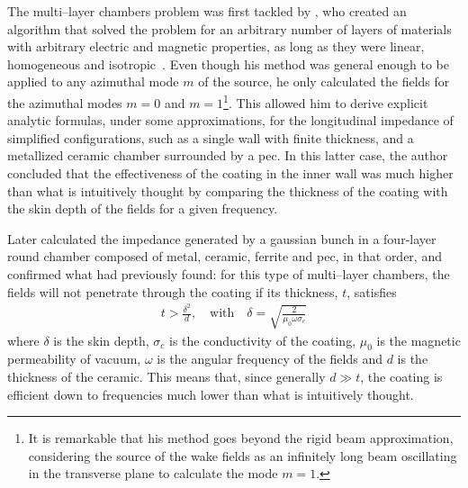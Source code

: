     The multi--layer chambers problem was first tackled by , who created an algorithm that solved the problem for an arbitrary number of layers of materials with arbitrary electric and magnetic properties, as long as they were linear, homogeneous and isotropic~\cite{Zotter1969,Zotter1969a,Zotter1970}. Even though his method was general enough to be applied to any azimuthal mode $m$ of the source, he only calculated the fields for the azimuthal modes $m=0$ and $m=1$\footnote{It is remarkable that his method goes beyond the rigid beam approximation, considering the source of the wake fields as an infinitely long beam oscillating in the transverse plane to calculate the mode $m=1$.}. This allowed him to derive explicit analytic formulas, under some approximations, for the longitudinal impedance of simplified configurations, such as a single wall with finite thickness, and a metallized ceramic chamber surrounded by a \gls{pec}. In this latter case, the author concluded that the effectiveness of the coating in the inner wall was much higher than what is intuitively thought by comparing the thickness of the coating with the skin depth of the fields for a given frequency.

    Later  calculated the impedance generated by a gaussian bunch in a four-layer round chamber composed of metal, ceramic, ferrite and \gls{pec}, in that order, and confirmed what  had previously found: for this type of multi--layer chambers, the fields will not penetrate through the coating if its thickness, $t$, satisfies
    \begin{align}
        t > \frac{\delta^2}{d}, \quad\text{with}\quad
        \delta = \sqrt{\frac{2}{\mu_0\omega\sigma_c}}
    \end{align}
    where $\delta$ is the skin depth, $\sigma_c$ is the conductivity of the coating, $\mu_0$ is the magnetic permeability of vacuum, $\omega$ is the angular frequency of the fields and $d$ is the thickness of the ceramic. This means that, since generally $d\gg t$, the coating is efficient down to frequencies much lower than what is intuitively thought.

